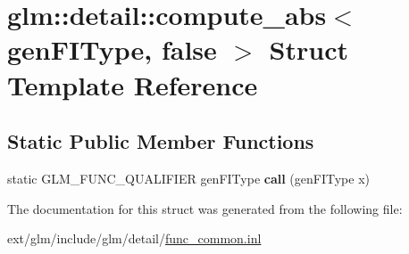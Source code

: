 \hypertarget{structglm_1_1detail_1_1compute__abs_3_01gen_f_i_type_00_01false_01_4}{\section{glm\-:\-:detail\-:\-:compute\-\_\-abs$<$ gen\-F\-I\-Type, false $>$ Struct Template Reference}
\label{structglm_1_1detail_1_1compute__abs_3_01gen_f_i_type_00_01false_01_4}
}
\subsection*{Static Public Member Functions}
\begin{DoxyCompactItemize}
\item 
\hypertarget{structglm_1_1detail_1_1compute__abs_3_01gen_f_i_type_00_01false_01_4_acc50915fdea0a19f047f019081c56dcc}{static G\-L\-M\-\_\-\-F\-U\-N\-C\-\_\-\-Q\-U\-A\-L\-I\-F\-I\-E\-R gen\-F\-I\-Type {\bfseries call} (gen\-F\-I\-Type x)}\label{structglm_1_1detail_1_1compute__abs_3_01gen_f_i_type_00_01false_01_4_acc50915fdea0a19f047f019081c56dcc}

\end{DoxyCompactItemize}


The documentation for this struct was generated from the following file\-:\begin{DoxyCompactItemize}
\item 
ext/glm/include/glm/detail/\hyperlink{func__common_8inl}{func\-\_\-common.\-inl}\end{DoxyCompactItemize}
